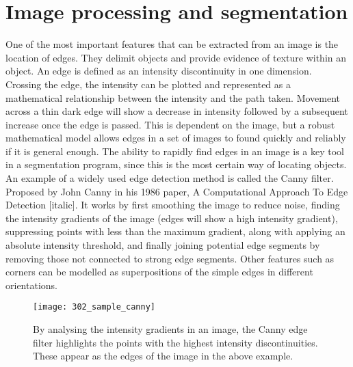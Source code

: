 \section{Image processing and segmentation}

One of the most important features that can be extracted from an image is the location of edges. They delimit objects and provide evidence of texture within an object. An edge is defined as an intensity discontinuity in one dimension. Crossing the edge, the intensity can be plotted and represented as a mathematical relationship between the intensity and the path taken. Movement across a thin dark edge will show a decrease in intensity followed by a subsequent increase once the edge is passed. This is dependent on the image, but a robust mathematical model allows edges in a set of images to found quickly and reliably if it is general enough. The ability to rapidly find edges in an image is a key tool in a segmentation program, since this is the most certain way of locating objects. An example of a widely used edge detection method is called the Canny filter. Proposed by John Canny in his 1986 paper, A Computational Approach To Edge Detection [italic]. It works by first smoothing the image to reduce noise, finding the intensity gradients of the image (edges will show a high intensity gradient), suppressing points with less than the maximum gradient, along with applying an absolute intensity threshold, and finally joining potential edge segments by removing those not connected to strong edge segments. Other features such as corners can be modelled as superpositions of the simple edges in different orientations.

\begin{figure}[h!]
 \centering
 \texttt{[image: 302\_sample\_canny]}
 \caption[Example of the Canny edge filter]{
 	By analysing the intensity gradients in an image, the Canny edge filter highlights the points with the highest intensity discontinuities. These appear as the edges of the image in the above example.
 }
 \label{fig:canny}
\end{figure}

